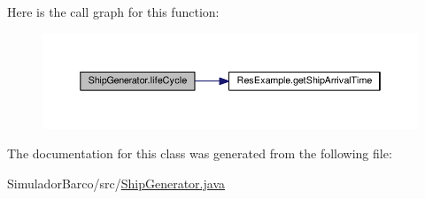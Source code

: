 Here is the call graph for this function\-:
\nopagebreak
\begin{figure}[H]
\begin{center}
\leavevmode
\includegraphics[width=350pt]{class_ship_generator_a2a03df464499a472d8b385cfd2546f69_cgraph}
\end{center}
\end{figure}




The documentation for this class was generated from the following file\-:\begin{DoxyCompactItemize}
\item 
Simulador\-Barco/src/\hyperlink{_ship_generator_8java}{Ship\-Generator.\-java}\end{DoxyCompactItemize}
